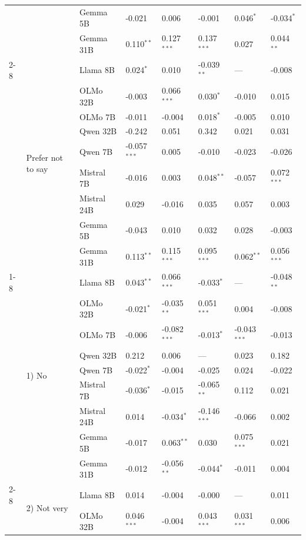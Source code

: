 \begin{longtable}[t]{llllllll}
 &  & Gemma 5B & -0.021 & 0.006 & -0.001 & 0.046$^{*}$ & -0.034$^{*}$ \\
 &  & Gemma 31B & 0.110$^{**}$ & 0.127$^{***}$ & 0.137$^{***}$ & 0.027 & 0.044$^{**}$ \\
\cline{2-8}
 & \multirow[t]{9}{*}{Prefer not to say} & Llama 8B & 0.024$^{*}$ & 0.010 & -0.039$^{**}$ & --- & -0.008 \\
 &  & OLMo 32B & -0.003 & 0.066$^{***}$ & 0.030$^{*}$ & -0.010 & 0.015 \\
 &  & OLMo 7B & -0.011 & -0.004 & 0.018$^{*}$ & -0.005 & 0.010 \\
 &  & Qwen 32B & -0.242 & 0.051 & 0.342 & 0.021 & 0.031 \\
 &  & Qwen 7B & -0.057$^{***}$ & 0.005 & -0.010 & -0.023 & -0.026 \\
 &  & Mistral 7B & -0.016 & 0.003 & 0.048$^{**}$ & -0.057 & 0.072$^{***}$ \\
 &  & Mistral 24B & 0.029 & -0.016 & 0.035 & 0.057 & 0.003 \\
 &  & Gemma 5B & -0.043 & 0.010 & 0.032 & 0.028 & -0.003 \\
 &  & Gemma 31B & 0.113$^{**}$ & 0.115$^{***}$ & 0.095$^{***}$ & 0.062$^{**}$ & 0.056$^{***}$ \\
\cline{1-8} \cline{2-8}
\multirow[t]{45}{*}{Religion Important} & \multirow[t]{9}{*}{1) No} & Llama 8B & 0.043$^{**}$ & 0.066$^{***}$ & -0.033$^{*}$ & --- & -0.048$^{**}$ \\
 &  & OLMo 32B & -0.021$^{*}$ & -0.035$^{**}$ & 0.051$^{***}$ & 0.004 & -0.008 \\
 &  & OLMo 7B & -0.006 & -0.082$^{***}$ & -0.013$^{*}$ & -0.043$^{***}$ & -0.013 \\
 &  & Qwen 32B & 0.212 & 0.006 & --- & 0.023 & 0.182 \\
 &  & Qwen 7B & -0.022$^{*}$ & -0.004 & -0.025 & 0.024 & -0.022 \\
 &  & Mistral 7B & -0.036$^{*}$ & -0.015 & -0.065$^{**}$ & 0.112 & 0.021 \\
 &  & Mistral 24B & 0.014 & -0.034$^{*}$ & -0.146$^{***}$ & -0.066 & 0.002 \\
 &  & Gemma 5B & -0.017 & 0.063$^{**}$ & 0.030 & 0.075$^{***}$ & 0.021 \\
 &  & Gemma 31B & -0.012 & -0.056$^{**}$ & -0.044$^{*}$ & -0.011 & 0.004 \\
\cline{2-8}
 & \multirow[t]{9}{*}{2) Not very} & Llama 8B & 0.014 & -0.004 & -0.000 & --- & 0.011 \\
 &  & OLMo 32B & 0.046$^{***}$ & -0.004 & 0.043$^{***}$ & 0.031$^{***}$ & 0.006 \\

\end{longtable}

